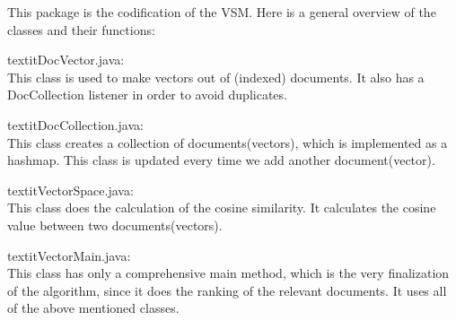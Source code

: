 \begin{description}
This package is the codification of the VSM. Here is a general overview of the classes and their functions:
\begin{description}
\item{textit{DocVector.java: }} \\
This class is used to make vectors out of (indexed) documents. It also has a DocCollection listener in order to avoid duplicates.
\item{textit{DocCollection.java: }} \\
This class creates a collection of documents(vectors), which is implemented as a hashmap. This class is updated every time we add another document(vector).
\item{textit{VectorSpace.java: }} \\
This class does the calculation of the cosine similarity. It calculates the cosine value between two documents(vectors).
\item{textit{VectorMain.java: }} \\
This class has only a comprehensive main method, which is the very finalization of the algorithm, since it does the ranking of the relevant documents. It uses all of the above mentioned classes.
\end{description}
\end{description}